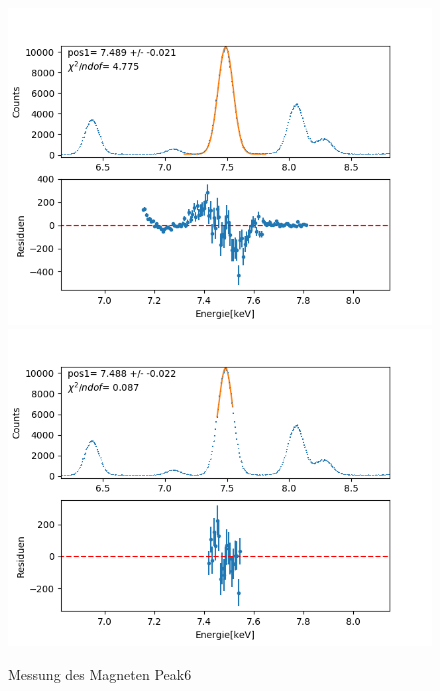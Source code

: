 \documentclass[12pt,a4paper]{article}
\begin{document}
\begin{figure}[H]
\centering
\includegraphics[scale=0.49]{Bilder/roentgen_spektren/magnet/mag6_1.png}
\includegraphics[scale=0.49]{Bilder/roentgen_spektren/magnet/mag6_2.png}
\caption{Messung des Magneten Peak6}
\end{figure}
\end{document}
